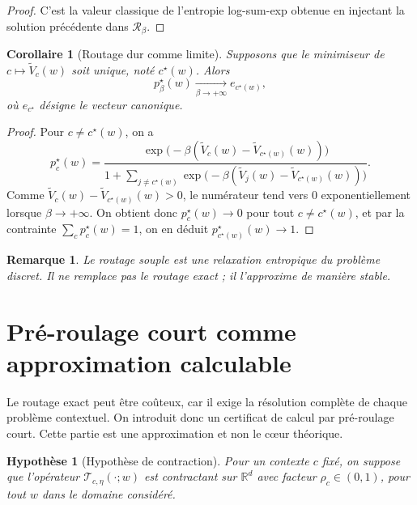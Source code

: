 \documentclass[11pt,a4paper]{article}
\newtheorem{assumption}{Hypothèse}[section]
\newtheorem{corollary}{Corollaire}[section]
\newtheorem{remark}{Remarque}[section]
\newcommand{\R}{\mathbb R}
\newcommand{\Tcal}{\mathcal T}
\newcommand{\Rcal}{\mathcal R}
\begin{document}
\begin{proof}
C'est la valeur classique de l'entropie log-sum-exp obtenue en injectant la solution précédente dans \(\Rcal_\beta\).
\end{proof}

\begin{corollary}[Routage dur comme limite]
Supposons que le minimiseur de \(c\mapsto \widetilde V_c(w)\) soit unique, noté \(c^\star(w)\). Alors
\[
p^\star_\beta(w)\xrightarrow[\beta\to+\infty]{} e_{c^\star(w)},
\]
où \(e_{c^\star}\) désigne le vecteur canonique.
\end{corollary}

\begin{proof}
Pour \(c\neq c^\star(w)\), on a
\[
p_c^\star(w)
=
\frac{\exp\!\bigl(-\beta(\widetilde V_c(w)-\widetilde V_{c^\star(w)}(w))\bigr)}
{1+\sum_{j\neq c^\star(w)}\exp\!\bigl(-\beta(\widetilde V_j(w)-\widetilde V_{c^\star(w)}(w))\bigr)}.
\]
Comme \(\widetilde V_c(w)-\widetilde V_{c^\star(w)}(w)>0\), le numérateur tend vers \(0\) exponentiellement lorsque \(\beta\to+\infty\). On obtient donc \(p_c^\star(w)\to0\) pour tout \(c\neq c^\star(w)\), et par la contrainte \(\sum_c p_c^\star(w)=1\), on en déduit \(p_{c^\star(w)}^\star(w)\to1\).
\end{proof}

\begin{remark}
Le routage souple est une relaxation entropique du problème discret. Il ne remplace pas le routage exact ; il l'approxime de manière stable.
\end{remark}

\section{Pré-roulage court comme approximation calculable}

Le routage exact peut être coûteux, car il exige la résolution complète de chaque problème contextuel. On introduit donc un certificat de calcul par pré-roulage court. Cette partie est une approximation et non le cœur théorique.

\begin{assumption}[Hypothèse de contraction]
Pour un contexte \(c\) fixé, on suppose que l'opérateur \(\Tcal_{c,\eta}(\cdot;w)\) est contractant sur \(\R^d\) avec facteur \(\rho_c\in(0,1)\), pour tout \(w\) dans le domaine considéré.
\end{assumption}
\end{document}
